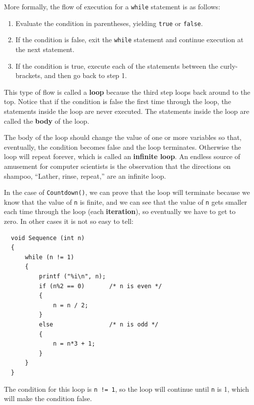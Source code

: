 More formally, the flow of execution for a {\tt while} statement
is as follows:

\begin{enumerate}

\item Evaluate the condition in parentheses, yielding {\tt true}
or {\tt false}.

\item If the condition is false, exit the {\tt while} statement
and continue execution at the next statement.

\item If the condition is true, execute each of the statements
between the curly-brackets, and then go back to step 1.

\end{enumerate}

This type of flow is called a {\bf loop} because the third step loops
back around to the top.  Notice that if the condition is false the
first time through the loop, the statements inside the loop are
never executed.  The statements inside the loop are called
the {\bf body} of the loop.


The body of the loop should change the value of
one or more variables so that, eventually, the condition becomes
false and the loop terminates.  Otherwise the loop will repeat
forever, which is called an {\bf infinite loop}.  An endless
source of amusement for computer scientists is the observation
that the directions on shampoo, ``Lather, rinse, repeat,'' are
an infinite loop.

In the case of {\tt Countdown()}, we can prove that the loop
will terminate because we know that the value of {\tt n} is
finite, and we can see that the value of {\tt n} gets smaller
each time through the loop (each {\bf iteration}), so
eventually we have to get to zero.  In other cases it is not
so easy to tell:

\begin{verbatim}
  void Sequence (int n) 
  {
      while (n != 1) 
      {
          printf ("%i\n", n);
          if (n%2 == 0)       /* n is even */
          {          
              n = n / 2;
          } 
          else                /* n is odd */
          {                  
              n = n*3 + 1;
          }
      }
  }
\end{verbatim}
%
The condition for this loop is {\tt n != 1}, so the loop
will continue until {\tt n} is 1, which will make the condition
false.

